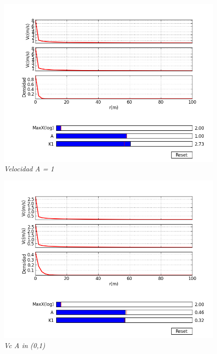 \documentclass[12pt]{book}
\begin{document}
\begin{figure}[!h]
 \centering
 \includegraphics[scale=0.7]{velocity.png}
 \caption{\emph{Velocidad A = 1}}
 \label{Fig: 1}
\end{figure}

\begin{figure}[!h]
 \centering
 \includegraphics[scale=0.7]{velocity2.png}
 \caption{\emph{Vc A in (0,1) }}
 \label{Fig: 1}
\end{figure}
\end{document}
